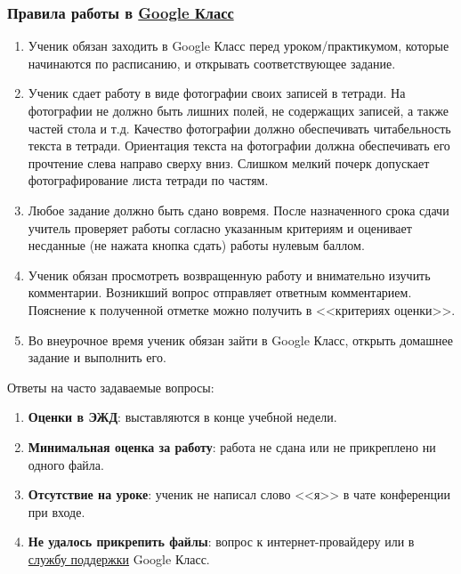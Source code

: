 \documentclass[geometry,a5paper]{pum}
\begin{document}
\subsubsection*{Правила работы в \href{https://classroom.google.com/}{Google Класс}}
\begin{enumerate}[nosep]
  \item Ученик обязан заходить в Google Класс перед уроком/практикумом, которые начинаются по расписанию, и открывать соответствующее задание.
  \item Ученик сдает работу в виде фотографии своих записей в тетради. На фотографии не должно быть лишних полей, не содержащих записей, а также частей стола и т.д.  Качество фотографии должно обеспечивать читабельность текста в тетради. Ориентация текста на фотографии должна обеспечивать его прочтение слева направо сверху вниз. Слишком мелкий почерк допускает фотографирование листа тетради по частям.
  \item Любое задание должно быть сдано вовремя. После назначенного срока сдачи учитель проверяет работы согласно указанным критериям и оценивает несданные (не нажата кнопка сдать) работы нулевым баллом.
  \item Ученик обязан просмотреть возвращенную работу и внимательно изучить комментарии. Возникший вопрос отправляет ответным комментарием. Пояснение к полученной отметке можно получить в <<критериях оценки>>.
  \item Во внеурочное время ученик обязан зайти в Google Класс, открыть домашнее задание и выполнить его.
\end{enumerate}

\begin{pumbox}{Ответы на часто задаваемые вопросы:}
  \begin{enumerate}[nosep]
    \item {\bf Оценки в ЭЖД}: выставляются в конце учебной недели. 
    \item {\bf Минимальная оценка за работу}: работа не сдана или не прикреплено ни одного файла.
    \item {\bf Отсутствие на уроке}: ученик не написал слово <<я>> в чате конференции при входе.
    \item {\bf Не удалось прикрепить файлы}: вопрос к интернет-провайдеру или в \href{https://support.google.com/edu/classroom/?hl=ru#topic=6020277}{службу поддержки} Google Класс.
  \end{enumerate}
\end{pumbox}

\end{document}
